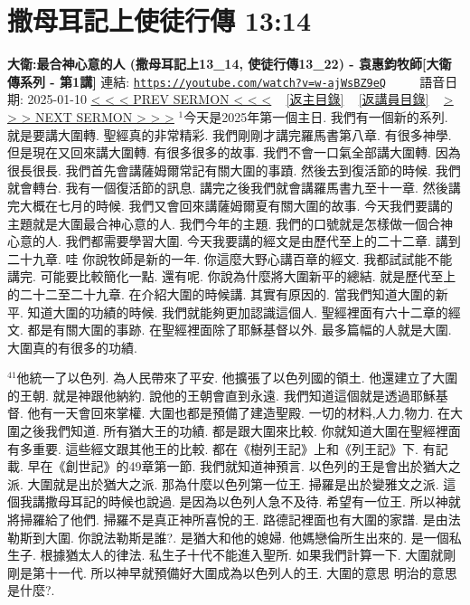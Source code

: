 \documentclass{book}
\begin{document}
\section{撒母耳記上使徒行傳 13:14}
\label{sec:w_ajWsBZ9eQ}
\textbf{大衛:最合神心意的人 (撒母耳記上13\_14, 使徒行傳13\_22) - 袁惠鈞牧師[大衛傳系列 - 第1講]}
\newline
\newline
連結: \href{https://youtube.com/watch?v=w-ajWsBZ9eQ}{\texttt{https://youtube.com/watch?v=w-ajWsBZ9eQ}} ~~~~ 語音日期: 2025-01-10
\newline
\newline
\hyperref[sec:9ORA5941xxk]{< < < PREV SERMON < < <}
~
\hyperlink{toc}{[返主目錄]}
~
\hyperref[ch:preacher11]{[返講員目錄]}
~
\hyperref[sec:yRzXvTTOZfM]{> > > NEXT SERMON > > >}
\newline
\newline
$^{1}$今天是2025年第一個主日.
我們有一個新的系列.
就是要講大圍轉.
聖經真的非常精彩.
我們剛剛才講完羅馬書第八章.
有很多神學.
但是現在又回來講大圍轉.
有很多很多的故事.
我們不會一口氣全部講大圍轉.
因為很長很長.
我們首先會講薩姆爾常記有關大圍的事蹟.
然後去到復活節的時候.
我們就會轉台.
我有一個復活節的訊息.
講完之後我們就會講羅馬書九至十一章.
然後講完大概在七月的時候.
我們又會回來講薩姆爾夏有關大圍的故事.
今天我們要講的主題就是大圍最合神心意的人.
我們今年的主題.
我們的口號就是怎樣做一個合神心意的人.
我們都需要學習大圍.
今天我要講的經文是由歷代至上的二十二章.
講到二十九章.
哇 你說牧師是新的一年.
你這麼大野心講百章的經文.
我都試試能不能講完.
可能要比較簡化一點.
還有呢.
你說為什麼將大圍新平的總結.
就是歷代至上的二十二至二十九章.
在介紹大圍的時候講.
其實有原因的.
當我們知道大圍的新平.
知道大圍的功績的時候.
我們就能夠更加認識這個人.
聖經裡面有六十二章的經文.
都是有關大圍的事跡.
在聖經裡面除了耶穌基督以外.
最多篇幅的人就是大圍.
大圍真的有很多的功績.

$^{41}$他統一了以色列.
為人民帶來了平安.
他擴張了以色列國的領土.
他還建立了大圍的王朝.
就是神跟他納約.
說他的王朝會直到永遠.
我們知道這個就是透過耶穌基督.
他有一天會回來掌權.
大圍也都是預備了建造聖殿.
一切的材料,人力,物力.
在大圍之後我們知道.
所有猶大王的功績.
都是跟大圍來比較.
你就知道大圍在聖經裡面有多重要.
這些經文跟其他王的比較.
都在《樹列王記》上和《列王記》下.
有記載.
早在《創世記》的49章第一節.
我們就知道神預言.
以色列的王是會出於猶大之派.
大圍就是出於猶大之派.
那為什麼以色列第一位王.
掃羅是出於變雅文之派.
這個我講撒母耳記的時候也說過.
是因為以色列人急不及待.
希望有一位王.
所以神就將掃羅給了他們.
掃羅不是真正神所喜悅的王.
路德記裡面也有大圍的家譜.
是由法勒斯到大圍.
你說法勒斯是誰?.
是猶大和他的媳婦.
他媽戀倫所生出來的.
是一個私生子.
根據猶太人的律法.
私生子十代不能進入聖所.
如果我們計算一下.
大圍就剛剛是第十一代.
所以神早就預備好大圍成為以色列人的王.
大圍的意思 明治的意思是什麼?.
\end{document}
